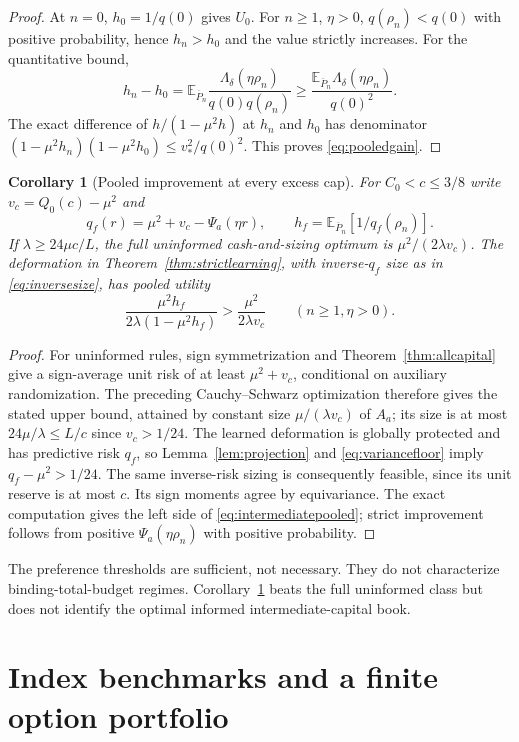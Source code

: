 \documentclass[11pt,a4paper]{amsart}
\theoremstyle{plain}
\newtheorem{corollary}[theorem]{Corollary}
\theoremstyle{definition}
\theoremstyle{remark}
\newcommand{\EE}{\mathbb{E}}
\newcommand{\Ebar}{\EE_{\overline P_n}}
\begin{document}
\begin{proof}
At $n=0$, $h_0=1/q(0)$ gives $U_0$. For $n\ge1$, $\eta>0$, $q(\rho_n)<q(0)$ with positive probability, hence $h_n>h_0$ and the value strictly increases. For the quantitative bound,
\[
 h_n-h_0=\Ebar\frac{\Lambda_\delta(\eta\rho_n)}{q(0)q(\rho_n)}
 \ge\frac{\Ebar\Lambda_\delta(\eta\rho_n)}{q(0)^2}.
\]
The exact difference of $h/(1-\mu^2h)$ at $h_n$ and $h_0$ has denominator
$(1-\mu^2h_n)(1-\mu^2h_0)\le v_*^2/q(0)^2$.
This proves \eqref{eq:pooledgain}.
\end{proof}

\begin{corollary}[Pooled improvement at every excess cap]\label{cor:intermediatepooled}
For $C_0<c\le3/8$ write $v_c=Q_0(c)-\mu^2$ and
\[
 q_f(r)=\mu^2+v_c-\Psi_a(\eta r),\qquad h_f=\Ebar[1/q_f(\rho_n)].
\]
If $\lambda\ge24\mu c/L$, the full uninformed cash-and-sizing optimum is $\mu^2/(2\lambda v_c)$. The deformation in Theorem~\ref{thm:strictlearning}, with inverse-$q_f$ size as in \eqref{eq:inversesize}, has pooled utility
\begin{equation}\label{eq:intermediatepooled}
 \frac{\mu^2h_f}{2\lambda(1-\mu^2h_f)}
 >\frac{\mu^2}{2\lambda v_c}\qquad(n\ge1,\eta>0).
\end{equation}
\end{corollary}
\begin{proof}
For uninformed rules, sign symmetrization and Theorem~\ref{thm:allcapital} give a sign-average unit risk of at least $\mu^2+v_c$, conditional on auxiliary randomization. The preceding Cauchy--Schwarz optimization therefore gives the stated upper bound, attained by constant size $\mu/(\lambda v_c)$ of $A_a$; its size is at most $24\mu/\lambda\le L/c$ since $v_c>1/24$.
The learned deformation is globally protected and has predictive risk $q_f$, so Lemma~\ref{lem:projection} and \eqref{eq:variancefloor} imply $q_f-\mu^2>1/24$. The same inverse-risk sizing is consequently feasible, since its unit reserve is at most $c$. Its sign moments agree by equivariance. The exact computation gives the left side of \eqref{eq:intermediatepooled}; strict improvement follows from positive $\Psi_a(\eta\rho_n)$ with positive probability.
\end{proof}
The preference thresholds are sufficient, not necessary. They do not characterize binding-total-budget regimes. Corollary~\ref{cor:intermediatepooled} beats the full uninformed class but does not identify the optimal informed intermediate-capital book.

\section{Index benchmarks and a finite option portfolio}\label{sec:comparison}
\end{document}
